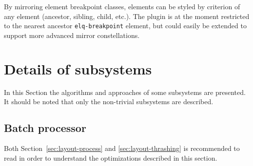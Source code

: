 \documentclass[a4paper,11pt]{kth-mag}
\newcommand{\code}[1]{\texttt{#1}}
\begin{document}
          By mirroring element breakpoint classes, elements can be styled by criterion of any element (ancestor, sibling, child, etc.).
          The plugin is at the moment restricted to the nearest ancestor \code{elq-breakpoint} element, but could easily be extended to support more advanced mirror constellations.
    \section{Details of subsystems}\label{sec:library-imp-details}
      In this Section the algorithms and approaches of some subsystems are presented.
      It should be noted that only the non-trivial subsystems are described.

      \subsection{Batch processor}\label{sec:imp_batch_processor}
        Both Section~\ref{sec:layout-process} and \ref{sec:layout-thrashing} is recommended to read in order to understand the optimizations described in this section.
\end{document}
